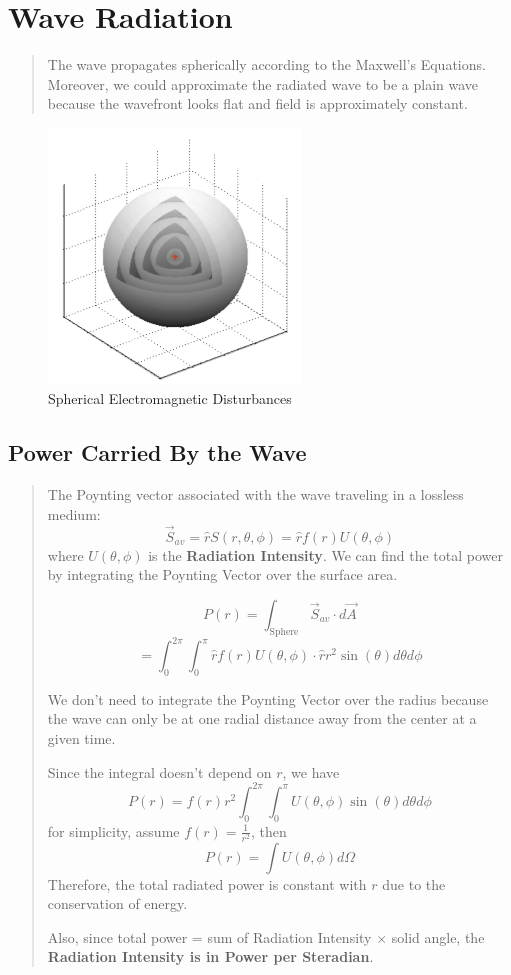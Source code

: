 \documentclass{article} %
\begin{document}
\section{Wave Radiation}
\begin{quote}
    The wave propagates spherically according to the Maxwell's Equations. Moreover, we could approximate the radiated wave to be a plain wave because the wavefront looks flat and field is approximately constant.
\end{quote}
\begin{figure}[H]
    \centering
    \includegraphics[width=0.6\textwidth]{./image/figure2.png}
    \caption{Spherical Electromagnetic Disturbances}
\end{figure}
\subsection{Power Carried By the Wave}
\begin{quote}
    The Poynting vector associated with the wave traveling in a lossless medium:
    \[\vec{S}_{av} = \hat{r} S(r, \theta, \phi) = \hat{r} f(r) U(\theta, \phi)\]
    where $U(\theta, \phi)$ is the \textbf{Radiation Intensity}.
    \smallskip
    We can find the total power by integrating the Poynting Vector over the surface area.

    \[P(r) = \int_{\text{Sphere}} \vec{S}_{av} \cdot d\vec{A}\]
    \[= \int_{0}^{2\pi} \int_{0}^{\pi} \hat{r} f(r)U(\theta, \phi) \cdot \hat{r} r^2 \sin(\theta) d\theta d\phi\]

    We don't need to integrate the Poynting Vector over the radius because the wave can only be at one radial distance away from the center at a given time.

    Since the integral doesn't depend on $r$, we have
    \[P(r) = f(r) r^2 \int_{0}^{2\pi} \int_{0}^{\pi} U(\theta, \phi) \sin(\theta) d\theta d\phi\]
    for simplicity, assume $f(r) = \frac{1}{r^2}$, then
    \[P(r) = \int U(\theta, \phi) d\Omega\]
    Therefore, the total radiated power is constant with $r$ due to the conservation of energy.

    Also, since total power = sum of Radiation Intensity $\times$ solid angle, the \textbf{Radiation Intensity is in Power per Steradian}.
\end{quote}
\end{document}
